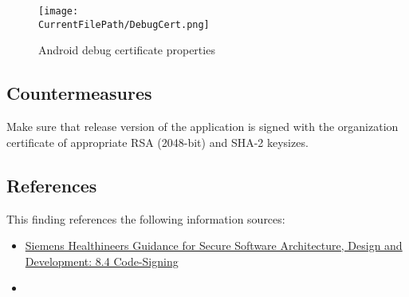 \begin{figure}[H]
\centering
\texttt{[image: \\CurrentFilePath/DebugCert.png]}
\caption{Android debug certificate properties}
\label{figure:DebugCert}
\end{figure}
	


\subsection*{Countermeasures}

Make sure that release version of the application is signed with the organization certificate of appropriate RSA (2048-bit)
and SHA-2 keysizes.


\subsection*{References}

This finding references the following information sources:

\begin{itemize}
	\item \href{https://doku-center.med.siemens.de/regelwerke/L4U-Intranet/GD/GD-41/GD-41-03-E.pdf}{Siemens Healthineers Guidance for Secure Software Architecture, Design and
	Development: 8.4 Code-Signing}
	\item {}
\end{itemize}

